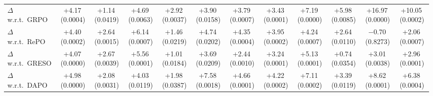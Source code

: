 \begin{table}[t]
{\begin{tabular}{lcccccc>{\columncolor{AvgCol}}c|ccc>{\columncolor{AvgCol}}c}
    $\Delta$ w.r.t.\ GRPO
    & +4.17{\tiny\,(0.0004)} & +1.14{\tiny\,(0.0419)} & +4.69{\tiny\,(0.0063)} & +2.92{\tiny\,(0.0037)} & +3.90{\tiny\,(0.0158)} & +3.79{\tiny\,(0.0007)} & +3.43{\tiny\,(0.0001)}
    & +7.19{\tiny\,(0.0000)} & +5.98{\tiny\,(0.0085)} & +16.97{\tiny\,(0.0000)} & +10.05{\tiny\,(0.0002)} \\
    $\Delta$ w.r.t.\ RePO
    & +4.40{\tiny\,(0.0002)} & +2.64{\tiny\,(0.0015)} & +6.14{\tiny\,(0.0007)} & +1.46{\tiny\,(0.0219)} & +4.74{\tiny\,(0.0202)} & +4.35{\tiny\,(0.0004)} & +3.95{\tiny\,(0.0002)}
    & +4.24{\tiny\,(0.0007)} & +2.64{\tiny\,(0.0110)} & $-$0.70{\tiny\,(0.8273)} & +2.06{\tiny\,(0.0007)} \\
    $\Delta$ w.r.t.\ GRESO
    & +4.07{\tiny\,(0.0000)} & +2.67{\tiny\,(0.0039)} & +5.56{\tiny\,(0.0001)} & +1.01{\tiny\,(0.0184)} & +3.69{\tiny\,(0.0209)} & +2.44{\tiny\,(0.0010)} & +3.24{\tiny\,(0.0001)}
    & +5.13{\tiny\,(0.0001)} & +0.74{\tiny\,(0.0354)} & +3.01{\tiny\,(0.0038)} & +2.96{\tiny\,(0.0001)} \\
    $\Delta$ w.r.t.\ DAPO
    & +4.98{\tiny\,(0.0000)} & +2.08{\tiny\,(0.0031)} & +4.03{\tiny\,(0.0119)} & +1.98{\tiny\,(0.0387)} & +7.58{\tiny\,(0.0018)} & +4.66{\tiny\,(0.0001)} & +4.22{\tiny\,(0.0002)}
    & +7.11{\tiny\,(0.0002)} & +3.39{\tiny\,(0.0119)} & +8.62{\tiny\,(0.0001)} & +6.38{\tiny\,(0.0004)} \\

    \bottomrule
    \end{tabular}
}
\end{table}
